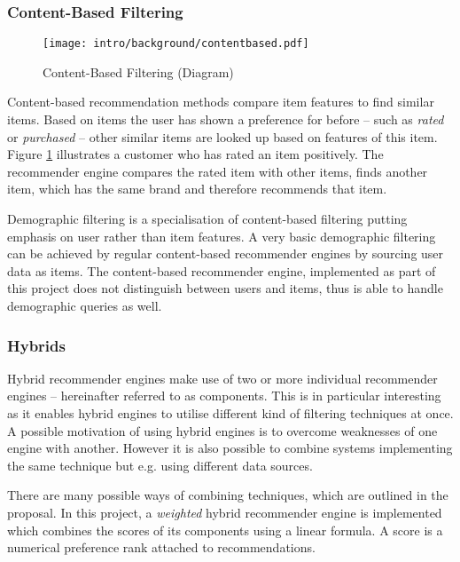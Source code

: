 \subsubsection{Content-Based Filtering}

\begin{figure}[ht]
    \texttt{[image: intro/background/contentbased.pdf]}
    \caption{Content-Based Filtering (Diagram)}
    \label{fig:intro-techniques-contentbased}
\end{figure}

Content-based recommendation methods compare item features to find similar items. Based on items the user has shown a preference for before -- such as \emph{rated} or \emph{purchased} -- other similar items are looked up based on features of this item. Figure \ref{fig:intro-techniques-contentbased} illustrates a customer who has rated an item positively. The recommender engine compares the rated item with other items, finds another item, which has the same brand and therefore recommends that item.

Demographic filtering is a specialisation of content-based filtering putting emphasis on user rather than item features. A very basic demographic filtering can be achieved by regular content-based recommender engines by sourcing user data as items. The content-based recommender engine, implemented as part of this project does not distinguish between users and items, thus is able to handle demographic queries as well.

\subsubsection{Hybrids}
\label{intro-bg-tech-hybrid}

Hybrid recommender engines make use of two or more individual recommender engines -- hereinafter referred to as components. This is in particular interesting as it enables hybrid engines to utilise different kind of filtering techniques at once. A possible motivation of using hybrid engines is to overcome weaknesses of one engine with another. However it is also possible to combine systems implementing the same technique but e.g. using different data sources.

There are many possible ways of combining techniques, which are outlined in the proposal. In this project, a \emph{weighted} hybrid recommender engine is implemented which combines the scores of its components using a linear formula. A score is a numerical preference rank attached to recommendations.

